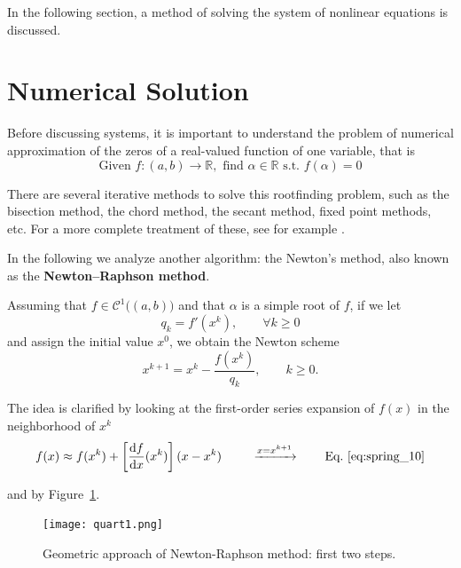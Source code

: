 In the following section, a method of solving the system of nonlinear equations is discussed.

\section{Numerical Solution}
\label{sec:numerical_solution1}%

Before discussing systems, it is important to understand the problem of numerical approximation of the zeros of a real-valued function of one variable, that is
\begin{equation*}
\label{eq:spring_8}
\boxed{\text{Given }f:(a,b)\to\mathbb{R},\text{ find }\alpha\in\mathbb{R}\text{ s.t. }f(\alpha)=0}
\end{equation*}

There are several iterative methods to solve this rootfinding problem, such as the bisection method, the chord method, the secant method, fixed point methods, etc. For a more complete treatment of these, see for example \cite{quarter}.

In the following we analyze another algorithm: the Newton's method, also known as the \textbf{Newton–Raphson method}.

Assuming that $f\in\mathcal{C}^1\big( (a,b) \big)$ and that $\alpha$ is a simple root of $f$, if we let
\begin{equation*}
\label{eq:spring_9}
q_k=f' ( x^k ),\qquad\forall k\geq 0
\end{equation*}
and assign the initial value $x^0$, we obtain the Newton scheme
\begin{equation}
\label{eq:spring_10}
x^{k+1}=x^k-\frac{f( x^k )}{q_k},\qquad k\geq 0.
\end{equation}

The idea is clarified by looking at the first-order series expansion of $f(x)$ in the neighborhood of $x^k$
\begin{equation*}
\label{eq:spring_11}
f(x)\approx f ( x^k )+\left[\frac{\text{d}f}{\text{d}x}(x^k)\right](x-x^k) \qquad\ \xrightarrow[]{x=x^{k+1}} \qquad \text{Eq.~\eqref{eq:spring_10}}
\end{equation*}

and by Figure~\ref{fig:quart1}.

\begin{figure}[H]
    \centering
    \texttt{[image: quart1.png]}
    \caption{Geometric approach of Newton-Raphson method: first two steps.}
    \label{fig:quart1}
\end{figure}

